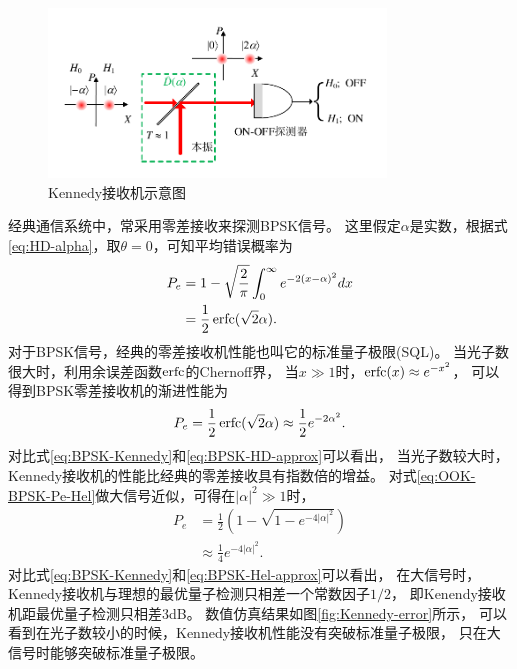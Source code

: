 \begin{figure}
\centering
  \includegraphics[width=0.8\textwidth]{figures/chap2/Kennedy-receiver}
  \caption{Kennedy接收机示意图}
  \label{fig:kennedy-receiver}
\end{figure}


经典通信系统中，常采用零差接收来探测BPSK信号。
这里假定$\alpha$是实数，根据式\ref{eq:HD-alpha}，取$\theta=0$，可知平均错误概率为
\begin{equation}
\begin{split}
P_e & = 1 -\sqrt{\frac{2}{\pi}}\int_0^{\infty} e^{-2(x - \alpha)^2} dx \\
    & = \frac{1}{2}\operatorname{erfc}(\sqrt{2}\alpha).
\end{split}
\end{equation}
对于BPSK信号，经典的零差接收机性能也叫它的标准量子极限(SQL)。
当光子数很大时，利用余误差函数$\operatorname{erfc}$的Chernoff界\cite{chang2011chernoff}，
当$x \gg 1$时，$\operatorname{erfc}(x) \approx e^{-x^2}$，
可以得到BPSK零差接收机的渐进性能为
\begin{equation}
P_e = \frac{1}{2}\operatorname{erfc}(\sqrt{2}\alpha) \approx \frac{1}{2} e^{-2\alpha^2}.
\label{eq:BPSK-HD-approx}
\end{equation}
对比式\ref{eq:BPSK-Kennedy}和\ref{eq:BPSK-HD-approx}可以看出，
当光子数较大时，Kennedy接收机的性能比经典的零差接收具有指数倍的增益。
对式\ref{eq:OOK-BPSK-Pe-Hel}做大信号近似，可得在$|\alpha|^2 \gg 1$时，
\begin{equation}
\begin{split}
P_e &= \frac{1}{2} (1 - \sqrt{1 - e^{-4|\alpha|^2}}) \\
    &\approx \frac{1}{4} e^{-4|\alpha|^2}.
\label{eq:BPSK-Hel-approx}
\end{split}
\end{equation}
对比式\ref{eq:BPSK-Kennedy}和\ref{eq:BPSK-Hel-approx}可以看出，
在大信号时，Kennedy接收机与理想的最优量子检测只相差一个常数因子$1/2$，
即Kenendy接收机距最优量子检测只相差3dB。
数值仿真结果如图\ref{fig:Kennedy-error}所示，
可以看到在光子数较小的时候，Kennedy接收机性能没有突破标准量子极限，
只在大信号时能够突破标准量子极限。


